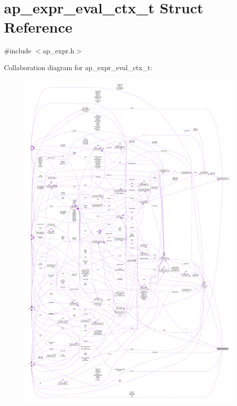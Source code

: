 \hypertarget{structap__expr__eval__ctx__t}{}\section{ap\+\_\+expr\+\_\+eval\+\_\+ctx\+\_\+t Struct Reference}
\label{structap__expr__eval__ctx__t}


{\ttfamily \#include $<$ap\+\_\+expr.\+h$>$}



Collaboration diagram for ap\+\_\+expr\+\_\+eval\+\_\+ctx\+\_\+t\+:
\nopagebreak
\begin{figure}[H]
\begin{center}
\leavevmode
\includegraphics[width=350pt]{structap__expr__eval__ctx__t__coll__graph}
\end{center}
\end{figure}
